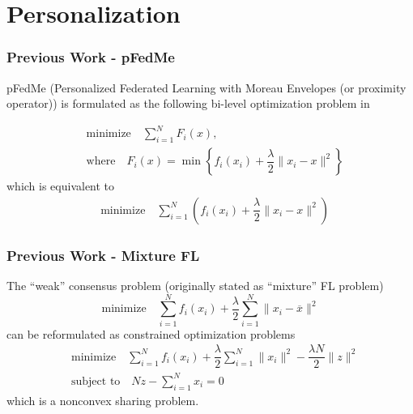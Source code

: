 \section{Personalization}


\begin{frame}
\frametitle{Previous Work - pFedMe}

pFedMe (Personalized Federated Learning with Moreau Envelopes (or proximity operator)) is formulated as the following bi-level optimization problem in \cite{t2020pfedme}

\begin{align*}
    & \text{minimize} \quad \sum\limits_{i=1}^N F_i(x), \\
    & \text{where} \quad F_i(x) = \min \left\{ f_i(x_i) + \dfrac{\lambda}{2} \lVert x_i - x \rVert^2 \right\}
\end{align*}
which is equivalent to
\begin{align*}
    & \text{minimize} \quad \sum\limits_{i=1}^N \left( f_i(x_i) + \dfrac{\lambda}{2} \lVert x_i - x \rVert^2 \right)
\end{align*}


\end{frame}


\begin{frame}
\frametitle{Previous Work - Mixture FL}

The ``weak'' consensus problem (originally stated as ``mixture'' FL problem)
$$\text{minimize} \quad \sum\limits_{i=1}^N f_i(x_i) + \dfrac{\lambda}{2} \sum\limits_{i=1}^N \lVert x_i - \overline{x} \rVert^2$$
can be reformulated as constrained optimization problems
\begin{align*}
    & \text{minimize} \quad \sum\limits_{i=1}^N f_i(x_i) + \dfrac{\lambda}{2} \sum\limits_{i=1}^N \lVert x_i \rVert^2 -\dfrac{\lambda N}{2} \lVert z \rVert^2 \\
    & \text{subject to} \quad Nz - \sum\limits_{i=1}^N x_i = 0
\end{align*}
which is a nonconvex sharing problem.


\end{frame}

